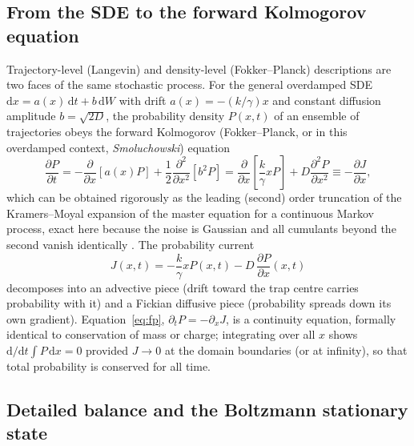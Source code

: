 \documentclass[11pt]{article}
\newcommand{\dd}{\mathrm{d}}
\newcommand{\pdv}[2]{\dfrac{\partial #1}{\partial #2}}
\newcommand{\ppdv}[2]{\dfrac{\partial^2 #1}{\partial #2^2}}
\begin{document}
\subsection{From the SDE to the forward Kolmogorov equation}

Trajectory-level (Langevin) and density-level (Fokker--Planck) descriptions are two faces of the same stochastic process. For the general overdamped SDE $\dd x = a(x)\,\dd t + b\,\dd W$ with drift $a(x) = -(k/\gamma)x$ and constant diffusion amplitude $b=\sqrt{2D}$, the probability density $P(x,t)$ of an ensemble of trajectories obeys the forward Kolmogorov (Fokker--Planck, or in this overdamped context, \emph{Smoluchowski}) equation
\begin{equation}
\pdv{P}{t} = -\pdv{}{x}\!\left[a(x)P\right] + \frac{1}{2}\ppdv{}{x}\!\left[b^2 P\right]
= \pdv{}{x}\!\left[\frac{k}{\gamma}xP\right] + D\ppdv{P}{x}
\equiv -\pdv{J}{x},
\label{eq:fp}
\end{equation}
which can be obtained rigorously as the leading (second) order truncation of the Kramers--Moyal expansion of the master equation for a continuous Markov process, exact here because the noise is Gaussian and all cumulants beyond the second vanish identically \cite{Gardiner2009}. The probability current
\begin{equation}
J(x,t) = -\frac{k}{\gamma}xP(x,t) - D\,\pdv{P}{x}(x,t)
\label{eq:current}
\end{equation}
decomposes into an advective piece (drift toward the trap centre carries probability with it) and a Fickian diffusive piece (probability spreads down its own gradient). Equation~\eqref{eq:fp}, $\partial_t P = -\partial_x J$, is a continuity equation, formally identical to conservation of mass or charge; integrating over all $x$ shows $\dd/\dd t \int P\,\dd x = 0$ provided $J\to 0$ at the domain boundaries (or at infinity), so that total probability is conserved for all time.

\subsection{Detailed balance and the Boltzmann stationary state}
\label{sec:detailed-balance}
\end{document}
